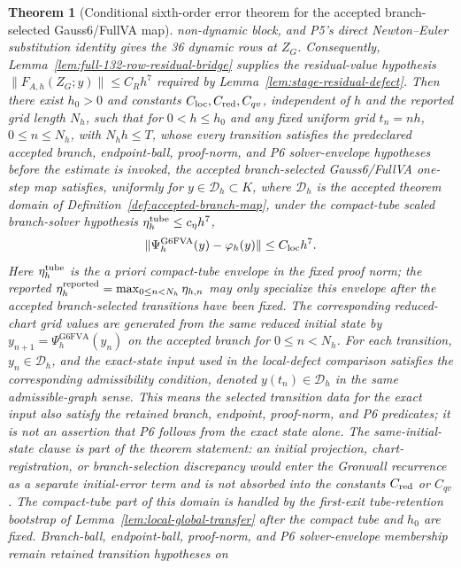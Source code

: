 \documentclass[preprint,12pt]{elsarticle}
\newtheorem{theorem}{Theorem}
\newcommand{\method}{Gauss6\slash FullVA}
\begin{document}
\begin{theorem}[Conditional sixth-order error theorem for the accepted branch-selected \method{} map]
non-dynamic block, and P5's direct Newton--Euler substitution identity gives
the 36 dynamic rows at \(Z_G\).  Consequently,
Lemma~\ref{lem:full-132-row-residual-bridge} supplies the residual-value
hypothesis \(\|F_{A,h}(Z_G;y)\|\le C_Rh^7\) required by
Lemma~\ref{lem:stage-residual-defect}.  Then
there exist \(h_0>0\) and constants
\(C_{\rm loc},C_{\rm red},C_{qv}\), independent of \(h\) and the reported grid length
\(N_h\), such that for \(0<h\le h_0\) and any fixed uniform grid
\(t_n=n h\), \(0\le n\le N_h\), with \(N_hh\le T\), whose every transition
satisfies the predeclared accepted branch, endpoint-ball, proof-norm, and P6
solver-envelope hypotheses before the estimate is invoked, the accepted
branch-selected \method{} one-step map satisfies, uniformly for
\(y\in\mathcal D_h\subset K\), where \(\mathcal D_h\) is the accepted theorem
domain of Definition~\ref{def:accepted-branch-map}, under the compact-tube scaled
branch-solver hypothesis \(\eta_h^{\rm tube}\le c_\eta h^7\),
\begin{equation}
\label{eq:g6fva-local-defect-theorem}
  \|\Psi_h^{\mathrm{G6FVA}}(y)-\varphi_h(y)\|\le C_{\rm loc}h^7 .
\end{equation}
Here \(\eta_h^{\rm tube}\) is the a priori compact-tube envelope in the fixed
proof norm; the reported
\(\eta_h^{\rm reported}=\max_{0\le n<N_h}\eta_{h,n}\) may only specialize this envelope after
the accepted branch-selected transitions have been fixed.
The corresponding reduced-chart grid values are generated from the same
reduced initial state by
\(y_{n+1}=\Psi_h^{\mathrm{G6FVA}}(y_n)\) on the accepted branch for
\(0\le n<N_h\).  For each transition, \(y_n\in\mathcal D_h\), and the
exact-state input used in the local-defect comparison satisfies the
corresponding admissibility condition, denoted \(y(t_n)\in\mathcal D_h\) in
the same admissible-graph sense.  This means the selected transition data for
the exact input also satisfy the retained branch, endpoint, proof-norm, and
P6 predicates; it is not an assertion that P6 follows from the exact state
alone.
The same-initial-state clause is part of the theorem statement: an initial
projection, chart-registration, or branch-selection discrepancy would enter
the Gronwall recurrence as a separate initial-error term and is not absorbed
into the constants \(C_{\rm red}\) or \(C_{qv}\).
The compact-tube part of this domain is handled by the first-exit
tube-retention bootstrap of Lemma~\ref{lem:local-global-transfer} after the
compact tube and \(h_0\) are fixed.  Branch-ball, endpoint-ball, proof-norm,
and P6 solver-envelope membership remain retained transition hypotheses on

\end{theorem}
\end{document}
